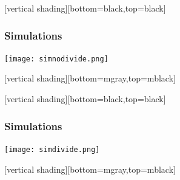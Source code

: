 \documentclass{beamer}
\begin{document}
{
    [vertical shading][bottom=black,top=black]
	
    \frame
    {
        \frametitle{Simulations}
        \begin{center}
            \texttt{[image: simnodivide.png]}
        \end{center}
    }

    [vertical shading][bottom=mgray,top=mblack]

}

{
    [vertical shading][bottom=black,top=black]
	
    \frame
    {
        \frametitle{Simulations}
        \begin{center}
            \texttt{[image: simdivide.png]}
        \end{center}
    }

    [vertical shading][bottom=mgray,top=mblack]

}
\end{document}
